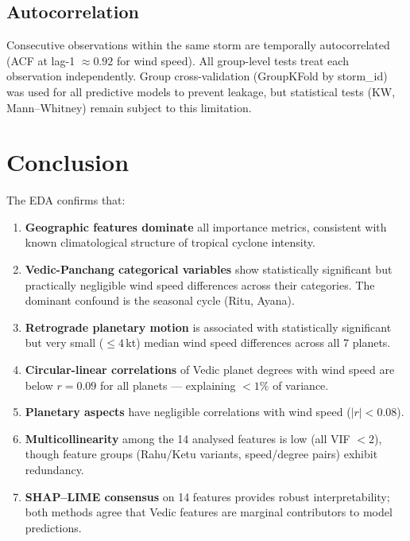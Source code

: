 \documentclass[11pt,a4paper]{article}
\begin{document}
\subsection{Autocorrelation}

Consecutive observations within the same storm are temporally autocorrelated
(ACF at lag-1 $\approx 0.92$ for wind speed). All group-level tests treat each
observation independently. Group cross-validation (GroupKFold by storm\_id) was
used for all predictive models to prevent leakage, but statistical tests
(KW, Mann--Whitney) remain subject to this limitation.

\section{Conclusion}

The EDA confirms that:
\begin{enumerate}[noitemsep]
  \item \textbf{Geographic features dominate} all importance metrics, consistent with
        known climatological structure of tropical cyclone intensity.
  \item \textbf{Vedic-Panchang categorical variables} show statistically significant but
        practically negligible wind speed differences across their categories. The
        dominant confound is the seasonal cycle (Ritu, Ayana).
  \item \textbf{Retrograde planetary motion} is associated with statistically significant
        but very small ($\leq 4$\,kt) median wind speed differences across all 7 planets.
  \item \textbf{Circular-linear correlations} of Vedic planet degrees with wind speed are
        below $r = 0.09$ for all planets --- explaining $< 1\%$ of variance.
  \item \textbf{Planetary aspects} have negligible correlations with wind speed ($|r| < 0.08$).
  \item \textbf{Multicollinearity} among the 14 analysed features is low (all VIF $< 2$),
        though feature groups (Rahu/Ketu variants, speed/degree pairs) exhibit redundancy.
  \item \textbf{SHAP--LIME consensus} on 14 features
        provides robust interpretability; both methods agree that Vedic features are marginal
        contributors to model predictions.
\end{enumerate}
\end{document}

